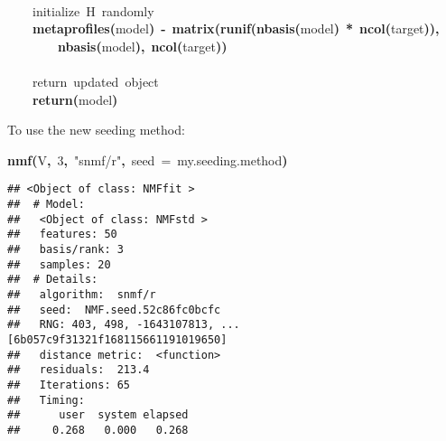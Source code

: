 \documentclass[a4paper]{article}\usepackage{graphicx, color}
\makeatletter
\newcommand{\hlnumber}[1]{\textcolor[rgb]{0,0,0}{#1}}%
\newcommand{\hlfunctioncall}[1]{\textcolor[rgb]{0.501960784313725,0,0.329411764705882}{\textbf{#1}}}%
\newcommand{\hlstring}[1]{\textcolor[rgb]{0.6,0.6,1}{#1}}%
\newcommand{\hlkeyword}[1]{\textcolor[rgb]{0,0,0}{\textbf{#1}}}%
\newcommand{\hlargument}[1]{\textcolor[rgb]{0.690196078431373,0.250980392156863,0.0196078431372549}{#1}}%
\newcommand{\hlcomment}[1]{\textcolor[rgb]{0.180392156862745,0.6,0.341176470588235}{#1}}%
\newcommand{\hlassignement}[1]{\textcolor[rgb]{0,0,0}{\textbf{#1}}}%
\newcommand{\hlsymbol}[1]{\textcolor[rgb]{0,0,0}{#1}}%
\newcommand{\hlstd}[1]{\textcolor[rgb]{0,0,0}{#1}}%
\newenvironment{kframe}{%
 \def\FrameCommand##1{\hskip\@totalleftmargin \hskip-\fboxsep
 \colorbox{shadecolor}{##1}\hskip-\fboxsep
     \hskip-\linewidth \hskip-\@totalleftmargin \hskip\columnwidth}%
 \MakeFramed {\advance\hsize-\width
   \@totalleftmargin\z@ \linewidth\hsize
   \@setminipage}}%
 {\par\unskip\endMakeFramed}
\newenvironment{knitrout}{}{} %
\makeatother
\begin{document}
\begin{knitrout}
\begin{kframe}
\begin{flushleft}
\hlstd{}\hspace*{\fill}\\
\hlstd{}{\ }{\ }{\ }{\ }\hlcomment{\usebox{\hlnormalsizeboxhash}{\ }initialize{\ }H{\ }randomly}\hspace*{\fill}\\
\hlstd{}{\ }{\ }{\ }{\ }\hlfunctioncall{metaprofiles}\hlkeyword{(}\hlsymbol{model}\hlkeyword{)}{\ }\hlassignement{\usebox{\hlnormalsizeboxlessthan}-}{\ }\hlfunctioncall{matrix}\hlkeyword{(}\hlfunctioncall{runif}\hlkeyword{(}\hlfunctioncall{nbasis}\hlkeyword{(}\hlsymbol{model}\hlkeyword{)}{\ }\hlkeyword{*}{\ }\hlfunctioncall{ncol}\hlkeyword{(}\hlsymbol{target}\hlkeyword{)}\hlkeyword{)}\hlkeyword{,}\hspace*{\fill}\\
\hlstd{}{\ }{\ }{\ }{\ }{\ }{\ }{\ }{\ }\hlfunctioncall{nbasis}\hlkeyword{(}\hlsymbol{model}\hlkeyword{)}\hlkeyword{,}{\ }\hlfunctioncall{ncol}\hlkeyword{(}\hlsymbol{target}\hlkeyword{)}\hlkeyword{)}\hspace*{\fill}\\
\hlstd{}\hspace*{\fill}\\
\hlstd{}{\ }{\ }{\ }{\ }\hlcomment{\usebox{\hlnormalsizeboxhash}{\ }return{\ }updated{\ }object}\hspace*{\fill}\\
\hlstd{}{\ }{\ }{\ }{\ }\hlfunctioncall{return}\hlkeyword{(}\hlsymbol{model}\hlkeyword{)}\hspace*{\fill}\\
\hlstd{}\hlkeyword{\usebox{\hlnormalsizeboxclosebrace}}\mbox{}
\normalfont
\end{flushleft}
\end{kframe}
\end{knitrout}


To use the new seeding method:
\begin{knitrout}
\color{fgcolor}\begin{kframe}
\begin{flushleft}
\ttfamily\noindent
\hlfunctioncall{nmf}\hlkeyword{(}\hlsymbol{V}\hlkeyword{,}{\ }\hlnumber{3}\hlkeyword{,}{\ }\hlstring{"{}snmf/r"{}}\hlkeyword{,}{\ }\hlargument{seed}{\ }\hlargument{=}{\ }\hlsymbol{my.seeding.method}\hlkeyword{)}\mbox{}
\normalfont
\end{flushleft}
\begin{verbatim}
## <Object of class: NMFfit >
##  # Model:
##   <Object of class: NMFstd >
##   features: 50 
##   basis/rank: 3 
##   samples: 20 
##  # Details:
##   algorithm:  snmf/r 
##   seed:  NMF.seed.52c86fc0bcfc 
##   RNG: 403, 498, -1643107813, ... [6b057c9f31321f168115661191019650]
##   distance metric:  <function> 
##   residuals:  213.4 
##   Iterations: 65 
##   Timing:
##      user  system elapsed 
##     0.268   0.000   0.268 
\end{verbatim}
\end{kframe}
\end{knitrout}
\end{document}
